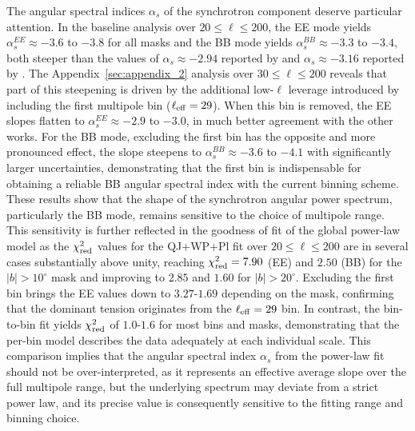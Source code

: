 The angular spectral indices $\alpha_s$ of the synchrotron component deserve particular attention. In the baseline analysis over $20 \leq \ell \leq 200$, the EE mode yields $\alpha_s^{EE} \approx -3.6$ to $-3.8$ for all masks and the BB mode yields $\alpha_s^{BB} \approx -3.3$ to $-3.4$, both steeper than the values of $\alpha_s \approx -2.94$ reported by \citet{Martire_2022} and $\alpha_s \approx -3.16$ reported by \citet{Krachmalnicoff_2018}. The Appendix~\ref{sec:appendix_2} analysis over $30 \leq \ell \leq 200$ reveals that part of this steepening is driven by the additional low-$\ell$ leverage introduced by including the first multipole bin ($\ell_{\rm eff} = 29$). When this bin is removed, the EE slopes flatten to $\alpha_s^{EE} \approx -2.9$ to $-3.0$, in much better agreement with the other works. For the BB mode, excluding the first bin has the opposite and more pronounced effect, the slope steepens to $\alpha_s^{BB} \approx -3.6$ to $-4.1$ with significantly larger uncertainties, demonstrating that the first bin is indispensable for obtaining a reliable BB angular spectral index with the current binning scheme. These results show that the shape of the synchrotron angular power spectrum, particularly the BB mode, remains sensitive to the choice of multipole range. This sensitivity is further reflected in the goodness of fit of the global power-law model as the $\chi_{\rm red}^2$ values for the QJ+WP+Pl fit over $20 \leq \ell \leq 200$ are in several cases substantially above unity, reaching $\chi^2_{\rm red} = 7.90$ (EE) and $2.50$ (BB) for the $|b| > 10^\circ$ mask and improving to $2.85$ and $1.60$ for $|b| > 20^\circ$. Excluding the first bin brings the EE values down to $3.27$-$1.69$ depending on the mask, confirming that the dominant tension originates from the $\ell_{\rm eff} = 29$ bin. In contrast, the bin-to-bin fit yields $\chi^2_{\rm red}$ of  $1.0$-$1.6$ for most bins and masks, demonstrating that the per-bin model describes the data adequately at each individual scale. This comparison implies that the angular spectral index $\alpha_s$ from the power-law fit should not be over-interpreted, as it represents an effective average slope over the full multipole range, but the underlying spectrum may deviate from a strict power law, and its precise value is consequently sensitive to the fitting range and binning choice.



